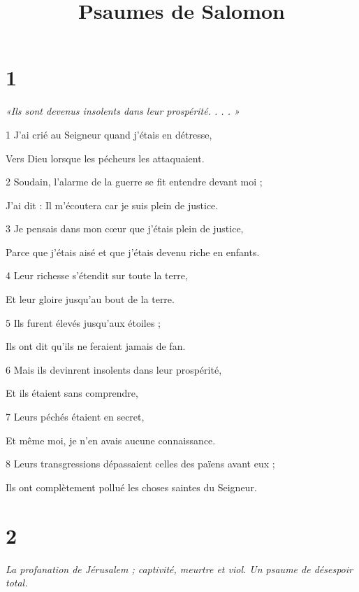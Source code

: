 

\title{Psaumes de Salomon}

\chapter{1}

\par \textit{«Ils sont devenus insolents dans leur prospérité. . . . »}

\par 1 J'ai crié au Seigneur quand j'étais en détresse,
\par     Vers Dieu lorsque les pécheurs les attaquaient.
\par 2 Soudain, l'alarme de la guerre se fit entendre devant moi ;
\par     J'ai dit : Il m'écoutera car je suis plein de justice.
\par 3 Je pensais dans mon cœur que j'étais plein de justice,
\par     Parce que j'étais aisé et que j'étais devenu riche en enfants.
\par 4 Leur richesse s'étendit sur toute la terre,
\par     Et leur gloire jusqu'au bout de la terre.
\par 5 Ils furent élevés jusqu'aux étoiles ;
\par     Ils ont dit qu’ils ne feraient jamais de fan.
\par 6 Mais ils devinrent insolents dans leur prospérité,
\par     Et ils étaient sans comprendre,
\par 7 Leurs péchés étaient en secret,
\par     Et même moi, je n’en avais aucune connaissance.
\par 8 Leurs transgressions dépassaient celles des païens avant eux ;
\par     Ils ont complètement pollué les choses saintes du Seigneur.

\chapter{2}

\par \textit{La profanation de Jérusalem ; captivité, meurtre et viol. Un psaume de désespoir total.}

